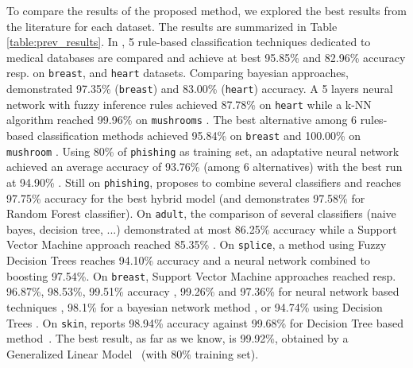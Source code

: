 \documentclass[preprint,12pt]{elsarticle}
\theoremstyle{definition}
\begin{document}
To compare the results of the proposed method, we explored the best results from the literature for each dataset.
The results are summarized in Table \ref{table:prev_results}. In \cite{doi:10.1504/IJBISE.2016.081590}, 5 rule-based classification techniques dedicated to medical databases are compared and achieve at best 95.85\% and 82.96\% accuracy resp. on \texttt{breast}, and \texttt{heart} datasets. Comparing bayesian approaches, \cite{Jiang:2012:LIW:2124637.2124641} demonstrated 97.35\% (\texttt{breast}) and 83.00\% (\texttt{heart}) accuracy. A 5 layers neural network with fuzzy inference rules achieved 87.78\% on \texttt{heart} \cite{sagir2017hybridised} while a k-NN algorithm reached 99.96\% on \texttt{mushrooms} \cite{Das:2001:FWB:645530.658297}. The best alternative among 6 rules-based classification methods achieved 95.84\% on \texttt{breast} and 100.00\% on \texttt{mushroom} \cite{HADI2017287}. Using 80\% of \texttt{phishing} as training set, an adaptative neural network achieved an average accuracy of 93.76\% (among 6 alternatives) with the best run at 94.90\% \cite{7727750}. Still on \texttt{phishing}, \cite{7881507} proposes to combine several classifiers and reaches 97.75\% accuracy for the best hybrid model (and demonstrates 97.58\% for Random Forest classifier). On \texttt{adult}, the comparison of several classifiers (naive bayes, decision tree, ...) demonstrated at most 86.25\% accuracy \cite{kou2012evaluation} while a Support Vector Machine approach reached 85.35\% \cite{Lee2001}. On \texttt{splice}, a method using Fuzzy Decision Trees \cite{5409447} reaches 94.10\% accuracy and a neural network combined to boosting \cite{catak2017} 97.54\%. On \texttt{breast}, Support Vector Machine approaches reached resp. 96.87\%, 98.53\%, 99.51\% accuracy \cite{CHEN20119014, POLAT2007694, akay2009support}, 99.26\% and 97.36\% for neural network based techniques \cite{MARCANOCEDENO20119573, ubeyli2007implementing}, 98.1\% for a bayesian network method \cite{fallahi2011expert}, or 94.74\% using Decision Trees \cite{quinlan1996improved}. On \texttt{skin}, \cite{catak2017} reports 98.94\% accuracy against 99.68\% for Decision Tree based method~\cite{6627823}. The best result, as far as we know, is 99.92\%, obtained by a Generalized Linear Model~\cite{basterrech2015generalized} (with 80\% training set).
\end{document}
